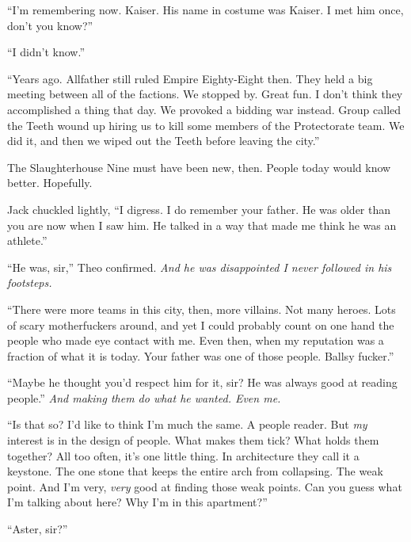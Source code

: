 ``I'm remembering now.  Kaiser.  His name in costume was Kaiser.  I met him once, don't you know?''



``I didn't know.''



``Years ago.  Allfather still ruled Empire Eighty-Eight then.  They held a big meeting between all of the factions.  We stopped by.  Great fun.  I don't think they accomplished a thing that day.  We provoked a bidding war instead.  Group called the Teeth wound up hiring us to kill some members of the Protectorate team.  We did it, and then we wiped out the Teeth before leaving the city.''



The Slaughterhouse Nine must have been new, then.  People today would know better.  Hopefully.



Jack chuckled lightly, ``I digress.  I do remember your father.  He was older than you are now when I saw him.  He talked in a way that made me think he was an athlete.''



``He was, sir,'' Theo confirmed.  \emph{And he was disappointed I never followed in his footsteps.}



``There were more teams in this city, then, more villains.  Not many heroes.  Lots of scary motherfuckers around, and yet I could probably count on one hand the people who made eye contact with me.  Even then, when my reputation was a fraction of what it is today.  Your father was one of those people.  Ballsy fucker.''



``Maybe he thought you'd respect him for it, sir?  He was always good at reading people.''  \emph{And making them do what he wanted. Even me.}



``Is that so?  I'd like to think I'm much the same.  A people reader.  But \emph{my} interest is in the design of people. What makes them tick?  What holds them together?  All too often, it's one little thing.  In architecture they call it a keystone.  The one stone that keeps the entire arch from collapsing.  The weak point.  And I'm very, \emph{very} good at finding those weak points.  Can you guess what I'm talking about here?  Why I'm in this apartment?''



``Aster, sir?''



